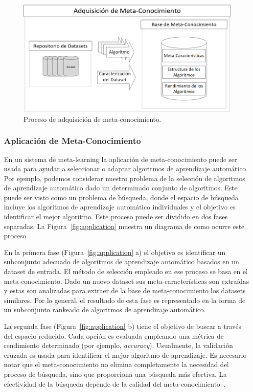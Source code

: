  \begin{figure}[H]
 	\centering
 	\includegraphics[scale=.5]{Figures/adquisition.png}
 	\caption{Proceso de adquisición de meta-conocimiento. }
 	\label{fig:adquisition}
 \end{figure}


\subsubsection{Aplicación de Meta-Conocimiento}

En un sistema de meta-learning la aplicación de meta-conocimiento puede ser usada para ayudar a seleccionar o adaptar algoritmos de aprendizaje automático. Por ejemplo, podemos considerar nuestro problema de la selección de algoritmos de aprendizaje automático dado un determinado conjunto de algoritmos. Este puede ser visto como un problema de búsqueda, donde el espacio de búsqueda incluye los algoritmos de aprendizaje automático individuales y el objetivo es identificar el mejor algoritmo. Este proceso puede ser dividido en dos fases separadas. La Figura~\ref{fig:application} muestra un diagrama de como ocurre este proceso.

En la primera fase (Figura~\ref{fig:application} a) el objetivo es identificar un subconjunto adecuado de algoritmos de aprendizaje automático basados en un dataset de entrada. El método de selección empleado en ese proceso se basa en el meta-conocimiento. Dado un nuevo dataset sus meta-características son extraídas y estas son analizadas para extraer de la base de meta-conocimiento los datasets similares. Por lo general, el resultado de esta fase es representado en la forma de un subconjunto rankeado de algoritmos de aprendizaje automático.

La segunda fase (Figura~\ref{fig:application} b) tiene el objetivo de buscar a través del espacio reducido. Cada opción es evaluada empleando una métrica de rendimiento determinado (por ejemplo, \textit{accuracy}). Usualmente, la validación cruzada es usada para identificar el mejor algoritmo de aprendizaje. Es necesario notar que el meta-conocimiento no elimina completamente la necesidad del proceso de búsqueda, sino que proporciona una búsqueda más efectiva. La efectividad de la búsqueda depende de la calidad del meta-conocimiento~\cite{bradzil2017metalearning}.


